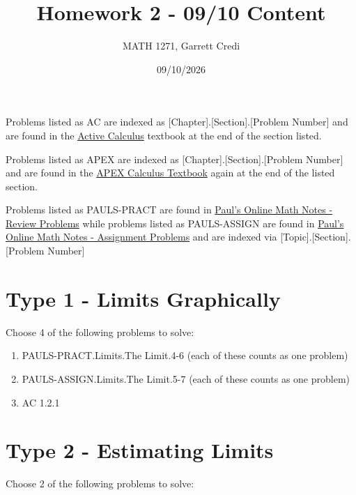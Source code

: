 \documentclass[12pt]{article}
\title{Homework 2 - 09/10 Content}
\author{MATH 1271, Garrett Credi}
\date{09/10/2026}
\begin{document}
\maketitle

Problems listed as AC are indexed as [Chapter].[Section].[Problem Number] and are found in the \href{https://activecalculus.org/single1e/frontmatter.html}{Active Calculus} 
textbook at the end of the section listed.

Problems listed as APEX are indexed as [Chapter].[Section].[Problem Number] and are found in the \href{https://opentext.uleth.ca/apex-calculus/apex-calculus.html}{APEX Calculus Textbook}
again at the end of the listed section.

Problems listed as PAULS-PRACT are found in \href{https://tutorial.math.lamar.edu/Problems/CalcI/CalcI.aspx}{Paul's Online Math Notes - Review Problems}
while problems listed as PAULS-ASSIGN are found in \href{https://tutorial.math.lamar.edu/ProblemsNS/CalcI/CalcI.aspx}{Paul's Online Math Notes - Assignment Problems}
and are indexed via [Topic].[Section].[Problem Number]




\section{Type 1 - Limits Graphically}
Choose 4 of the following problems to solve:

\begin{enumerate}
  \item PAULS-PRACT.Limits.The Limit.4-6 (each of these counts as one problem)
  \item PAULS-ASSIGN.Limits.The Limit.5-7 (each of these counts as one problem)
  \item AC 1.2.1
\end{enumerate}

\section{Type 2 - Estimating Limits}
Choose 2 of the following problems to solve:
\end{document}
